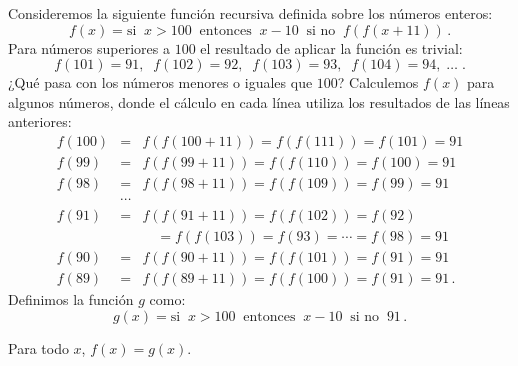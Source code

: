 Consideremos la siguiente función recursiva definida sobre los números enteros:
\[
f(x) = \textrm{si}\;\; x > 100 \;\;\textrm{entonces}\;\; x - 10 \;\;\textrm{si no}\;\; f(f(x+11))\,.
\]
Para números superiores a $100$ el resultado de aplicar la función es trivial:
\[
f(101) = 91, \;\; f(102) = 92,\;\; f(103) = 93,\;\; f(104) = 94,\;\ldots\;.
\]
¿Qué pasa con los números menores o iguales que $100$? Calculemos $f(x)$ para algunos números, donde el cálculo en cada línea utiliza los resultados de las líneas anteriores:
\begin{eqnarray*}
f(100) &=& f(f(100+11)) = f(f(111)) = f(101) = 91\\
f(99) &=& f(f(99+11)) = f(f(110)) = f(100) = 91\\
f(98) &=& f(f(98+11)) = f(f(109)) = f(99) = 91\\
&\cdots&\\
f(91) &=& f(f(91+11)) = f(f(102)) = f(92)\\
&& \quad = f(f(103)) = f(93) = \cdots =f(98) = 91\\
f(90) &=& f(f(90+11)) = f(f(101)) = f(91) = 91\\
f(89) &=& f(f(89+11)) = f(f(100)) = f(91) = 91\,.
\end{eqnarray*}
Definimos la función $g$ como:
\[
g(x) = \textrm{si}\;\; x > 100 \;\;\textrm{entonces}\;\; x - 10 \;\;\textrm{si no}\;\; 91\,.
\]

\begin{theorem}
Para todo $x$, $f(x) = g(x)$.
\end{theorem}

